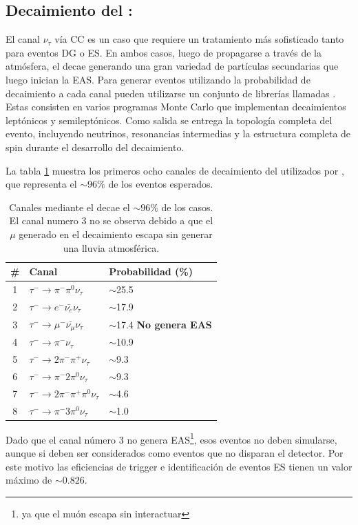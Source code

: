 	
	\subsection{Decaimiento del \tauon{}: \tauola{}}
	\label{sbsc:tauola}
	El canal $\nu_{\tau}$ vía CC es un caso que requiere un tratamiento más sofisticado tanto para eventos DG o ES.
	En ambos casos, luego de propagarse a trav\'es de la atm\'osfera, el \tauon{} decae generando una gran variedad de part\'iculas secundarias que luego inician la EAS.
	Para generar eventos utilizando la probabilidad de decaimiento a cada canal pueden utilizarse un conjunto de librer\'ias llamadas \tauola{}.
	Estas consisten en varios programas Monte Carlo que implementan decaimientos lept\'onicos y semilept\'onicos.
	Como salida se entrega la topolog\'ia completa del evento, incluyendo neutrinos, resonancias intermedias y la estructura completa de spin durante el desarrollo del decaimiento.
	
	La tabla \ref{tab:tauDecay} muestra los primeros ocho canales de decaimiento del \tauon{} utilizados por \tauola{}, que representa el $\sim96\%$ de los eventos esperados.
	\begin{table}[h]
		\begin{center}
		\begin{tabular}{|c|l|l|}
		\hline
		\# &Canal   & Probabilidad (\%) \\
		\hline
		1&$\tau^{-}\rightarrow \pi^{-}\pi^{0}\nu_{\tau}$   & $\sim$25.5 \\
		2&$\tau^{-}\rightarrow e^{-}\bar{\nu_{e}}\nu_{\tau}$   & $\sim$17.9 \\
		3&$\tau^{-}\rightarrow \mu^{-}\bar{\nu_{\mu}}\nu_{\tau}$   & $\sim$17.4 {\bf No genera EAS}\\
		4&$\tau^{-}\rightarrow \pi^{-}\nu_{\tau}$   & $\sim$10.9 \\
		5&$\tau^{-}\rightarrow 2\pi^{-}\pi^{+}\nu_{\tau}$   & $\sim$9.3 \\
		6&$\tau^{-}\rightarrow \pi^{-}2\pi^{0}\nu_{\tau}$   & $\sim$9.3 \\
		7&$\tau^{-}\rightarrow 2\pi^{-}\pi^{+}\pi^{0}\nu_{\tau}$   & $\sim$4.6 \\
		8&$\tau^{-}\rightarrow \pi^{-}3\pi^{0}\nu_{\tau}$   & $\sim$1.0 \\
		\hline
		\end{tabular}
		\end{center}
		\caption{\label{tab:tauDecay}
		Canales mediante el \tauon{} decae el $\sim96\%$ de los casos. El canal numero 3 no se observa debido a que el $\mu$ generado en el decaimiento escapa sin generar una lluvia atmosférica.
		}
	\end{table}
	Dado que el canal número 3 no genera EAS\footnote{ya que el muón escapa sin interactuar}, esos eventos no deben simularse, aunque si deben ser considerados como eventos que no disparan el detector.
	Por este motivo las eficiencias de trigger e identificación de eventos ES tienen un valor máximo de $\sim0.826$.
	
